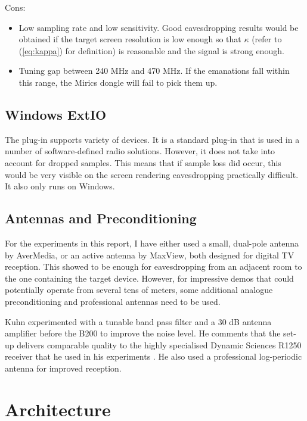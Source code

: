 \documentclass[a4paper,12pt,twoside,openright]{report}
\begin{document}
Cons:
\begin{itemize}
	\item Low sampling rate and low sensitivity. Good eavesdropping results would be obtained if the target screen resolution is low enough so that $\kappa$ (refer to (\ref{eq:kappa}) for definition) is reasonable and the signal is strong enough.
	\item Tuning gap between 240 MHz and 470 MHz. If the emanations fall within this range, the Mirics dongle will fail to pick them up.
\end{itemize}

\subsection{Windows ExtIO}

The plug-in supports variety of devices. It is a standard plug-in that is used in a number of software-defined radio solutions. However, it does not take into account for dropped samples. This means that if sample loss did occur, this would be very visible on the screen rendering eavesdropping practically difficult. It also only runs on Windows.

\subsection{Antennas and Preconditioning}

For the experiments in this report, I have either used a small, dual-pole antenna by AverMedia, or an active antenna by MaxView, both designed for digital TV reception. This showed to be enough for eavesdropping from an adjacent room to the one containing the target device. However, for impressive demos that could potentially operate from several tens of meters, some additional analogue preconditioning and professional antennas need to be used.

Kuhn experimented with a tunable band pass filter and a 30 dB antenna amplifier before the B200 to improve the noise level. He comments that the set-up delivers comparable quality to the highly specialised Dynamic Sciences R1250 receiver that he used in his experiments \cite{kuhn2003compromising}. He also used a professional log-periodic antenna for improved reception.

\section{Architecture}
\end{document}
